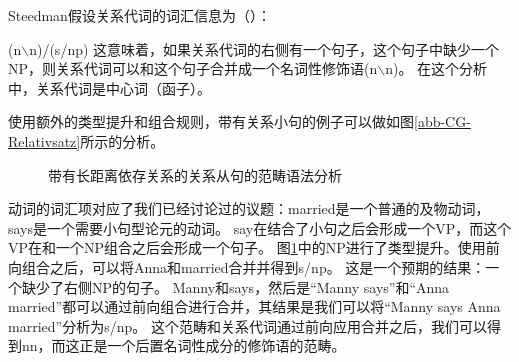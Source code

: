 Steedman假设关系代词的词汇信息为（）：

\ea
\label{le-Relativpronomen-CG}
(n$\backslash$n)/(s/np)
\z
这意味着，如果关系代词的右侧有一个句子，这个句子中缺少一个NP，则关系代词可以和这个句子合并成一个名词性修饰语(n$\backslash$n)。
在这个分析中，关系代词是中心词（函子）。

使用额外的类型提升和组合规则，带有关系小句的例子可以做如图\vref{abb-CG-Relativsatz}所示的分析。
%
\begin{figure}
\centerline{%
}
\caption{\label{abb-CG-Relativsatz}带有长距离依存关系的关系从句的范畴语法分析}
\end{figure}%
%
动词的词汇项对应了我们已经讨论过的议题：married是一个普通的及物动词，says是一个需要小句型论元的动词。
say在结合了小句之后会形成一个VP，而这个VP在和一个NP组合之后会形成一个句子。
图\ref{abb-CG-Relativsatz}中的NP进行了类型提升。使用前向组合之后，可以将Anna和married合并并得到s/np。
这是一个预期的结果：一个缺少了右侧NP的句子。
Manny和says，然后是“Manny says”和“Anna married”都可以通过前向组合进行合并，其结果是我们可以将“Manny says Anna married”分析为s/np。
这个范畴和关系代词通过前向应用合并之后，我们可以得到n\bs n，而这正是一个后置名词性成分的修饰语的范畴。

